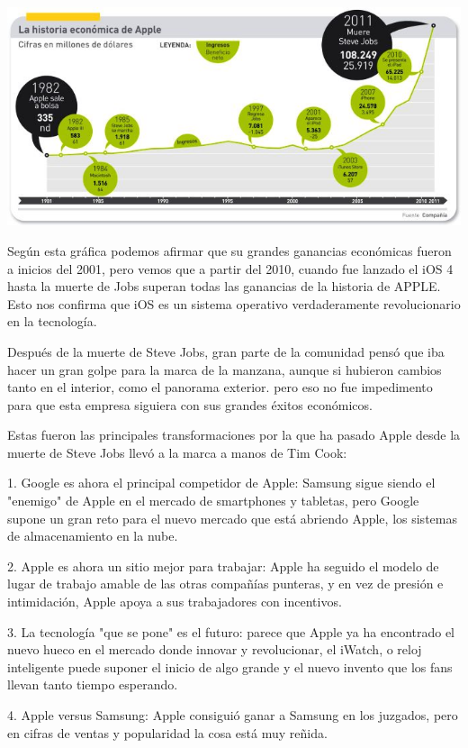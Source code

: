 \includegraphics[scale=0.5]{img/cp08/img0801.png}

Según esta gráfica podemos afirmar que su grandes ganancias
económicas fueron a inicios del 2001, pero vemos que a partir
del 2010, cuando fue lanzado el iOS 4 hasta la muerte de Jobs
superan todas las ganancias de la historia de APPLE. Esto nos
confirma que iOS es un sistema operativo verdaderamente
revolucionario en la tecnología.

Después de la muerte de Steve Jobs, gran parte de la
comunidad pensó que iba hacer un gran golpe
para la marca de la manzana, aunque si
hubieron cambios tanto en el interior, como el
panorama exterior. pero eso no fue impedimento
para que esta empresa siguiera con sus grandes
éxitos económicos.

Estas fueron las principales transformaciones por la que ha
pasado Apple desde la muerte de Steve Jobs
llevó a la marca a manos de Tim Cook:

1. Google es ahora el principal competidor de Apple:
Samsung sigue siendo el "enemigo" de Apple en el mercado de
smartphones y tabletas, pero Google supone un gran reto para el
nuevo mercado que está abriendo Apple, los sistemas de
almacenamiento en la nube.

2. Apple es ahora un sitio mejor para trabajar: Apple ha
seguido el modelo de lugar de trabajo amable de las otras
compañías punteras, y en vez de presión e intimidación, Apple
apoya a sus trabajadores con incentivos.

3. La tecnología "que se pone" es el futuro: parece que
Apple ya ha encontrado el nuevo hueco en el mercado donde
innovar y revolucionar, el iWatch, o reloj inteligente puede
suponer el inicio de algo grande y el nuevo invento que los fans
llevan tanto tiempo esperando.

4. Apple versus Samsung: Apple consiguió ganar a Samsung
en los juzgados, pero en cifras de ventas y popularidad la cosa
está muy reñida.

